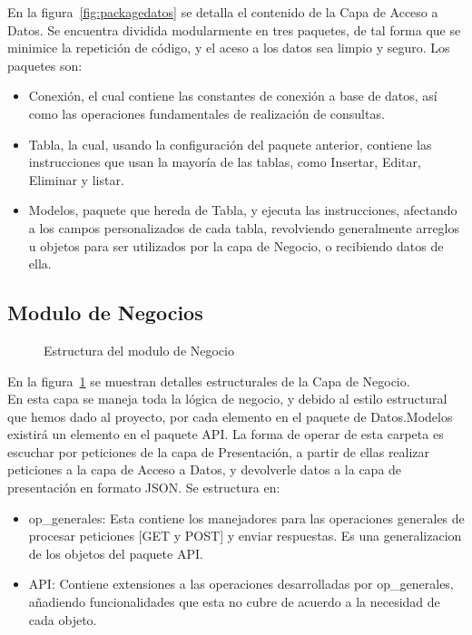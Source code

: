     En la figura~\ref{fig:packagedatos} se detalla el contenido de la Capa de Acceso a Datos. Se encuentra dividida modularmente en tres paquetes, de tal forma que se minimice la repetición de código, y el aceso a los datos sea limpio y seguro. Los paquetes son: \\
    \begin{itemize}
        \item Conexión, el cual contiene las constantes de conexión a base de datos, así como las operaciones fundamentales de realización de consultas.
        \item Tabla, la cual, usando la configuración del paquete anterior, contiene las instrucciones que usan la mayoría de las tablas, como Insertar, Editar, Eliminar y listar.
        \item Modelos, paquete que hereda de Tabla, y ejecuta las instrucciones, afectando a los campos personalizados de cada tabla, revolviendo generalmente arreglos u objetos para ser utilizados por la capa de Negocio, o recibiendo datos de ella.
    \end{itemize}
        
        
    \subsection{Modulo de Negocios}
    \begin{figure}[htbp!]
    	\begin{center}
    		\caption{Estructura del modulo de Negocio}
    		\label{fig:negocio}
    	\end{center}
    \end{figure}
        
    En la figura~\ref{fig:negocio} se muestran detalles estructurales de la Capa de Negocio. \\
    En esta capa se maneja toda la lógica de negocio, y debido al estilo estructural que hemos dado al proyecto, por cada elemento en el paquete de Datos.Modelos existirá un elemento en el paquete API. La forma de operar de esta carpeta es escuchar por peticiones de la capa de Presentación, a partir de ellas realizar peticiones a la capa de Acceso a Datos, y devolverle datos a la capa de presentación en formato JSON. Se estructura en:
    \begin{itemize}
        \item op\_generales: Esta contiene los manejadores para las operaciones generales de procesar peticiones [GET y POST] y enviar respuestas. Es una generalizacion de los objetos del paquete API.
        \item API: Contiene extensiones a las operaciones desarrolladas por op\_generales, añadiendo funcionalidades que esta no cubre de acuerdo a la necesidad de cada objeto.
    \end{itemize}
    
